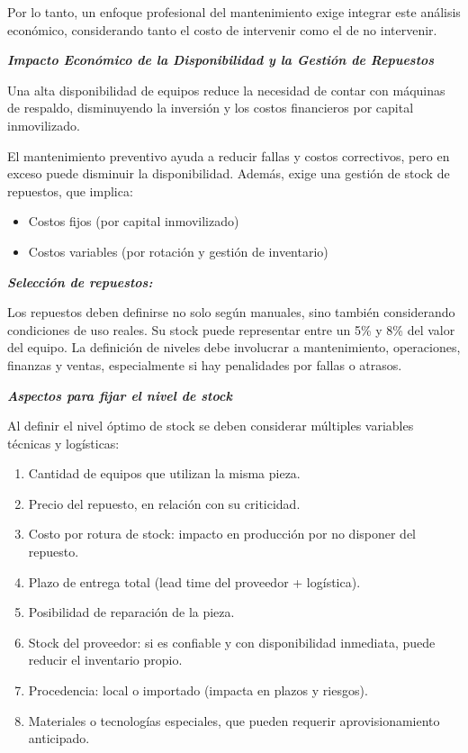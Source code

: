 \documentclass[a4paper,oneside,11pt]{article}
\begin{document}
Por lo tanto, un enfoque profesional del mantenimiento exige integrar este análisis económico, considerando tanto el costo de intervenir como el de no intervenir.

\textbf{\textit{Impacto Económico de la Disponibilidad y la Gestión de Repuestos}}

Una alta disponibilidad de equipos reduce la necesidad de contar con máquinas de respaldo, disminuyendo la inversión y los costos financieros por capital inmovilizado.

El mantenimiento preventivo ayuda a reducir fallas y costos correctivos, pero en exceso puede disminuir la disponibilidad. Además, exige una gestión de stock de repuestos, que implica:

\begin{itemize}
    \item Costos fijos (por capital inmovilizado)
    \item Costos variables (por rotación y gestión de inventario)
\end{itemize}

\textbf{\textit{Selección de repuestos:}}

Los repuestos deben definirse no solo según manuales, sino también considerando condiciones de uso reales. Su stock puede representar entre un 5\% y 8\% del valor del equipo. La definición de niveles debe involucrar a mantenimiento, operaciones, finanzas y ventas, especialmente si hay penalidades por fallas o atrasos.


\textbf{\textit{Aspectos para fijar el nivel de stock}}

Al definir el nivel óptimo de stock se deben considerar múltiples variables técnicas y logísticas:
\begin{enumerate}
    \item Cantidad de equipos que utilizan la misma pieza.
    \item Precio del repuesto, en relación con su criticidad.
    \item Costo por rotura de stock: impacto en producción por no disponer del repuesto.
    \item Plazo de entrega total (lead time del proveedor + logística).
    \item Posibilidad de reparación de la pieza.
    \item Stock del proveedor: si es confiable y con disponibilidad inmediata, puede reducir el inventario propio.
    \item Procedencia: local o importado (impacta en plazos y riesgos).
    \item Materiales o tecnologías especiales, que pueden requerir aprovisionamiento anticipado.
\end{enumerate}
\end{document}
